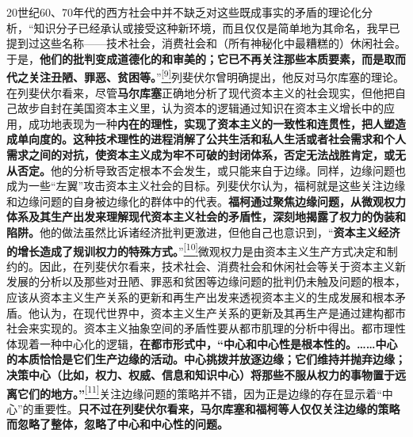 \documentclass[UTF8, fontset = sourcesans, a4paper, oneside, zihao =
-4, scheme=chinese, no-math, space=true]{ctexbook}
\begin{document}
20世纪60、70年代的西方社会中并不缺乏对这些既成事实的矛盾的理论化分析，``知识分子已经承认或接受这种新环境，而且仅仅是简单地为其命名，我早已提到过这些名称------技术社会，消费社会和（所有神秘化中最糟糕的）休闲社会。于是，\textbf{他们的批判变成道德化的和审美的；它已不再关注那些本质要素，而是取而代之关注丑陋、罪恶、贫困等。}''\protect\hypertarget{part0008_split_001.htmlux5cux23w9}{}{}\protect\hyperlink{part0008_split_003.htmlux5cux23m9}{\textsuperscript{{[}9{]}}}列斐伏尔曾明确提出，他反对马尔库塞的理论。在列斐伏尔看来，尽管\textbf{马尔库塞}正确地分析了现代资本主义的社会现实，但他把自己故步自封在美国资本主义里，认为资本的逻辑通过知识在资本主义增长中的应用，成功地表现为一种\textbf{内在的理性，实现了资本主义的一致性和连贯性，把人塑造成单向度的。这种技术理性的进程消解了公共生活和私人生活或者社会需求和个人需求之间的对抗，使资本主义成为牢不可破的封闭体系，否定无法战胜肯定，或无从否定。}他的分析导致否定根本不会发生，或只能来自于边缘。同样，边缘问题也成为一些``左翼''攻击资本主义社会的目标。列斐伏尔认为，福柯就是这些关注边缘和边缘问题的自身被边缘化的群体中的代表。\textbf{福柯通过聚焦边缘问题，从微观权力体系及其生产出发来理解现代资本主义社会的矛盾性，深刻地揭露了权力的伪装和陷阱。}他的做法虽然比诉诸经济批判更激进，但他自己也意识到，``\textbf{资本主义经济的增长造成了规训权力的特殊方式。}''\protect\hypertarget{part0008_split_001.htmlux5cux23w10}{}{}\protect\hyperlink{part0008_split_003.htmlux5cux23m10}{\textsuperscript{{[}10{]}}}微观权力是由资本主义生产方式决定和制约的。因此，在列斐伏尔看来，技术社会、消费社会和休闲社会等关于资本主义新发展的分析以及那些对丑陋、罪恶和贫困等边缘问题的批判仍未触及问题的根本，应该从资本主义生产关系的更新和再生产出发来透视资本主义的生成发展和根本矛盾。他认为，在现代世界中，资本主义生产关系的更新及其再生产是通过建构都市社会来实现的。资本主义抽象空间的矛盾性要从都市肌理的分析中得出。都市理性体现着一种中心化的逻辑，\textbf{在都市形式中，``中心和中心性是根本性的。……中心的本质恰恰是它们生产边缘的活动。中心挑拨并放逐边缘；它们维持并抛弃边缘；决策中心（比如，权力、权威、信息和知识中心）将那些不服从权力的事物置于远离它们的地方。''}\protect\hypertarget{part0008_split_001.htmlux5cux23w11}{}{}\protect\hyperlink{part0008_split_003.htmlux5cux23m11}{\textsuperscript{{[}11{]}}}关注边缘问题的策略并不错，因为正是边缘的存在显示着``中心''的重要性。\textbf{只不过在列斐伏尔看来，马尔库塞和福柯等人仅仅关注边缘的策略而忽略了整体，忽略了中心和中心性的问题。}
\end{document}
